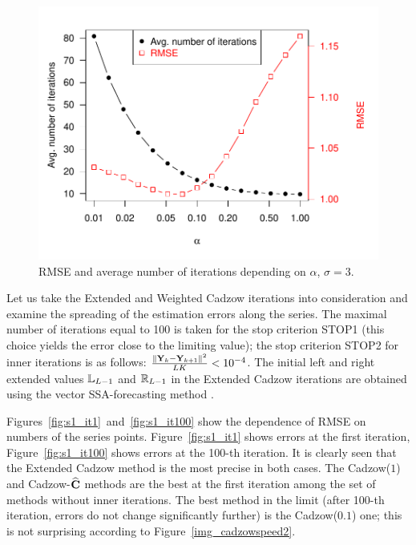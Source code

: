 \documentclass[sii]{ipart}
\begin{document}
\begin{figure}[!hhh]
	\includegraphics[width = \columnwidth]{2axis-3.pdf}
	\caption{RMSE and average number of iterations depending on $\alpha$, $\sigma=3$.}
	\label{img_2axis-3}
\end{figure}


\smallskip
Let us take the Extended and Weighted Cadzow iterations into consideration and examine the spreading of the estimation errors along the series. The maximal number of iterations equal to 100 is taken for the stop criterion STOP1 (this choice yields the error close to the limiting value); the stop criterion STOP2 for inner iterations is as follows:
$\frac{\|\mathbf{Y}_k - \mathbf{Y}_{k+1}\|^2}{LK} < 10^{-4}$. The initial left and right extended values $\mathbb{L}_{L-1}$ and $\mathbb{R}_{L-1}$ in the Extended Cadzow iterations are obtained using the vector SSA-forecasting method \cite[chapter 2.3.1]{Golyandina.etal2001}.

Figures~\ref{fig:s1_it1}~and~\ref{fig:s1_it100} show the dependence of RMSE on numbers of the series points. Figure~\ref{fig:s1_it1} shows errors at the first iteration, Figure~\ref{fig:s1_it100} shows errors at the 100-th iteration. It is clearly seen that the Extended Cadzow method is the most precise in both cases. The Cadzow($1$) and Cadzow-$\widehat{\mathbf{C}}$ methods are the best at the first iteration among the set of methods without inner iterations. The best method in the limit (after 100-th iteration, errors do not change significantly further) is the Cadzow($0.1$) one; this is not surprising according to Figure~\ref{img_cadzowspeed2}.
\end{document}
